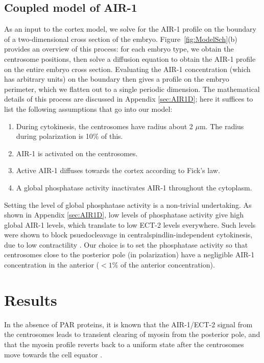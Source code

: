 \documentclass[11pt]{article}
\begin{document}
\subsection{Coupled model of AIR-1}
As an input to the cortex model, we solve for the AIR-1 profile on the boundary of a two-dimensional cross section of the embryo. Figure\ \ref{fig:ModelSch}(b) provides an overview of this process: for each embryo type, we obtain the centrosome positions, then solve a diffusion equation to obtain the AIR-1 profile on the entire embryo cross section. Evaluating the AIR-1 concentration (which has arbitrary units) on the boundary then gives a profile on the embryo perimeter, which we flatten out to a single periodic dimension. The mathematical details of this process are discussed in Appendix \ref{sec:AIR1D}; here it suffices to list the following assumptions that go into our model:
\begin{enumerate}
\item During cytokinesis, the centrosomes have radius about 2 $\mu$m. The radius during polarization is 10\% of this.
\item AIR-1 is activated on the centrosomes.
\item Active AIR-1 diffuses towards the cortex according to Fick's law.
\item A global phosphatase activity inactivates AIR-1 throughout the cytoplasm. 
\end{enumerate}
Setting the level of global phosphatase activity is a non-trivial undertaking. As shown in Appendix \ref{sec:AIR1D}, low levels of phosphatase activity give high global AIR-1 levels, which translate to low ECT-2 levels everywhere. Such levels were shown to block psuedocleavage in centralspindlin-independent cytokinesis, due to low contractility \citep{afshar2010regulation, kotak2016aurora}. Our choice is to set the phosphatase activity so that centrosomes close to the posterior pole (in polarization) have a negligible AIR-1 concentration in the anterior ($< 1\%$ of the anterior concentration).

\section{Results}
In the absence of PAR proteins, it is known that the AIR-1/ECT-2 signal from the centrosomes leads to transient clearing of myosin from the posterior pole, and that the myosin profile reverts back to a uniform state after the centrosomes move towards the cell equator \citep[Fig.~2E]{gross2019guiding}. 
\end{document}
